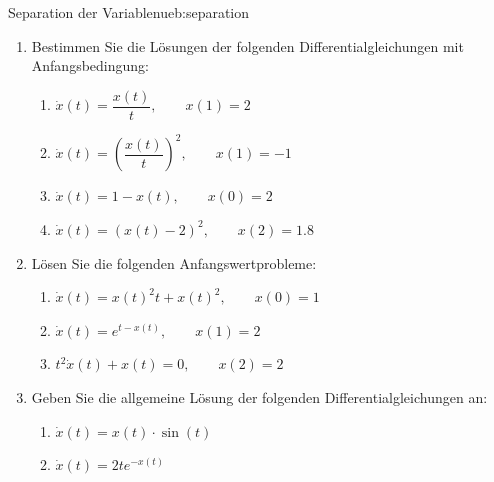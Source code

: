 \begin{ueb}{Separation der Variablen}{ueb:separation}

    \begin{enumerate}
        \item Bestimmen Sie die Lösungen der folgenden
              Differentialgleichungen mit Anfangsbedingung:

              \begin{enumerate}[label=\alph*)]
                  \item \(\dot{x}(t)=\dfrac{x(t)}{t},
                        \qquad x(1)=2\)

                  \item \(\dot{x}(t)=\left(\dfrac{x(t)}{t}\right)^2,
                        \qquad x(1)=-1\)

                  \item \(\dot{x}(t)=1-x(t),
                        \qquad x(0)=2\)

                  \item \(\dot{x}(t)=(x(t)-2)^2,
                        \qquad x(2)=1.8\)
              \end{enumerate}

        \item Lösen Sie die folgenden Anfangswertprobleme:

              \begin{enumerate}[label=\alph*)]
                  \item \(\dot{x}(t)=x(t)^2t+x(t)^2,
                        \qquad x(0)=1\)

                  \item \(\dot{x}(t)=e^{t-x(t)},
                        \qquad x(1)=2\)

                  \item \(t^2\dot{x}(t)+x(t)=0,
                        \qquad x(2)=2\)
              \end{enumerate}

        \item Geben Sie die allgemeine Lösung der folgenden
              Differentialgleichungen an:

              \begin{enumerate}[label=\alph*)]
                  \item \(\dot{x}(t)=x(t)\cdot\sin(t)\)

                  \item \(\dot{x}(t)=2t e^{-x(t)}\)
              \end{enumerate}
    \end{enumerate}

\end{ueb}
\clearpage

